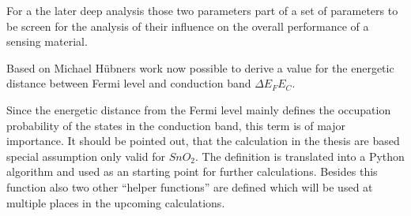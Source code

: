\documentclass[11pt]{article}
\begin{document}
For a the later deep analysis those two parameters part of a set of
parameters to be screen for the analysis of their influence on the
overall performance of a sensing material.

Based on Michael Hübners work now possible to derive a value for the
energetic distance between Fermi level and conduction band
\(\Delta E_FE_C\).

Since the energetic distance from the Fermi level mainly defines the
occupation probability of the states in the conduction band, this term
is of major importance. It should be pointed out, that the calculation
in the thesis are based special assumption only valid for \(SnO_2\). The
definition is translated into a Python algorithm and used as an starting
point for further calculations. Besides this function also two other
``helper functions'' are defined which will be used at multiple places
in the upcoming calculations.
\end{document}
